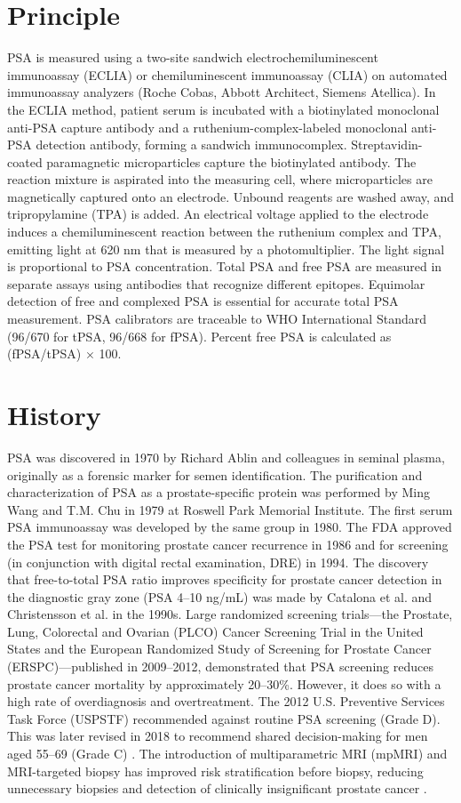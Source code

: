 \section*{Principle}
PSA is measured using a two-site sandwich electrochemiluminescent immunoassay (ECLIA) or chemiluminescent immunoassay (CLIA) on automated immunoassay analyzers (Roche Cobas, Abbott Architect, Siemens Atellica). In the ECLIA method, patient serum is incubated with a biotinylated monoclonal anti-PSA capture antibody and a ruthenium-complex-labeled monoclonal anti-PSA detection antibody, forming a sandwich immunocomplex. Streptavidin-coated paramagnetic microparticles capture the biotinylated antibody. The reaction mixture is aspirated into the measuring cell, where microparticles are magnetically captured onto an electrode. Unbound reagents are washed away, and tripropylamine (TPA) is added. An electrical voltage applied to the electrode induces a chemiluminescent reaction between the ruthenium complex and TPA, emitting light at 620 nm that is measured by a photomultiplier. The light signal is proportional to PSA concentration. Total PSA and free PSA are measured in separate assays using antibodies that recognize different epitopes. Equimolar detection of free and complexed PSA is essential for accurate total PSA measurement. PSA calibrators are traceable to WHO International Standard (96/670 for tPSA, 96/668 for fPSA). Percent free PSA is calculated as (fPSA/tPSA) $\times$ 100.

\section*{History}
PSA was discovered in 1970 by Richard Ablin and colleagues in seminal plasma, originally as a forensic marker for semen identification. The purification and characterization of PSA as a prostate-specific protein was performed by Ming Wang and T.M. Chu in 1979 at Roswell Park Memorial Institute. The first serum PSA immunoassay was developed by the same group in 1980. The FDA approved the PSA test for monitoring prostate cancer recurrence in 1986 and for screening (in conjunction with digital rectal examination, DRE) in 1994. The discovery that free-to-total PSA ratio improves specificity for prostate cancer detection in the diagnostic gray zone (PSA 4--10 ng/mL) was made by Catalona et al. and Christensson et al. in the 1990s. Large randomized screening trials---the Prostate, Lung, Colorectal and Ovarian (PLCO) Cancer Screening Trial in the United States and the European Randomized Study of Screening for Prostate Cancer (ERSPC)---published in 2009--2012, demonstrated that PSA screening reduces prostate cancer mortality by approximately 20--30\%. However, it does so with a high rate of overdiagnosis and overtreatment. The 2012 U.S. Preventive Services Task Force (USPSTF) recommended against routine PSA screening (Grade D). This was later revised in 2018 to recommend shared decision-making for men aged 55--69 (Grade C) \cite{uspstf2018prostate}. The introduction of multiparametric MRI (mpMRI) and MRI-targeted biopsy has improved risk stratification before biopsy, reducing unnecessary biopsies and detection of clinically insignificant prostate cancer \cite{kasivisvanathan2018mri}.

